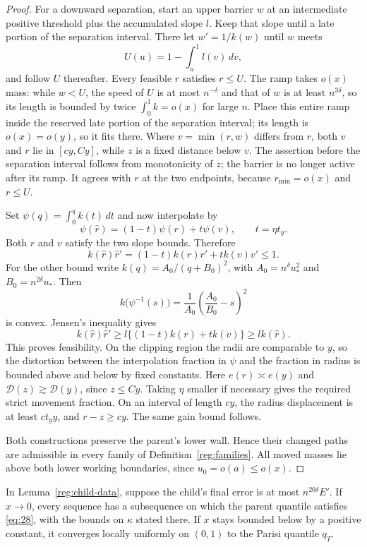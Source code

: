 \begin{proof}
For a downward separation, start an upper barrier $w$ at an
intermediate positive threshold plus the accumulated slope $l$.
Keep that slope until a late portion of the separation interval.
There let $w'=1/k(w)$ until $w$ meets
\[
 U(u)=1-\int_u^1l(v)\,dv,
\]
and follow $U$ thereafter.  Every feasible $r$ satisfies $r\le U$.
The ramp takes $o(x)$ mass: while $w<U$, the speed of $U$ is at
most $n^{-\delta}$ and that of $w$ is at least $n^{3\delta}$,
so its length is bounded by twice $\int_0^1k=o(x)$ for large $n$.
Place this entire ramp inside the reserved late portion of the
separation interval; its length is $o(x)=o(y)$, so it fits there.
Where $v=\min(r,w)$ differs from $r$, both $v$ and $r$ lie in
$[cy,Cy]$, while $z$ is a fixed distance below $v$.  The assertion
before the separation interval follows from monotonicity of $z$;
the barrier is no longer active after its ramp.  It agrees with
$r$ at the two endpoints, because $r_{\min}=o(x)$ and $r\le U$.

Set $\psi(q)=\int_0^qk(t)\,dt$ and now interpolate by
\[
 \psi(\widehat r)=(1-t)\psi(r)+t\psi(v),\qquad t=\eta t_y.
\]
Both $r$ and $v$ satisfy the two slope bounds.  Therefore
\[
 k(\widehat r)\widehat r'
      =(1-t)k(r)r'+tk(v)v'\le1.
\]
For the other bound write $k(q)=A_0/(q+B_0)^2$, with
$A_0=n^\delta u_*^2$ and $B_0=n^{2\delta}u_*$.  Then
\[
 k\bigl(\psi^{-1}(s)\bigr)
       =\frac1{A_0}\left(\frac{A_0}{B_0}-s\right)^2
\]
is convex.  Jensen's inequality gives
\[
 k(\widehat r)\widehat r'
    \ge l\{(1-t)k(r)+tk(v)\}\ge l k(\widehat r).
\]
This proves feasibility.  On the clipping region the radii are
comparable to $y$, so the distortion between the interpolation
fraction in $\psi$ and the fraction in radius is bounded above
and below by fixed constants.  Here $e(r)\asymp e(y)$ and
$\mathcal D(z)\gtrsim\mathcal D(y)$, since $z\le Cy$.
Taking $\eta$ smaller if necessary gives the required strict
movement fraction.  On an interval of length $cy$, the radius
displacement is at least $ct_yy$, and $r-z\ge cy$.
The same gain bound follows.

Both constructions preserve the parent's lower wall.  Hence their
changed paths are admissible in every family of
Definition~\ref{reg:families}.  All moved masses lie above both
lower working boundaries, since $u_0=o(a)\le o(x)$.
\end{proof}

\begin{lemma}
\label{reg:successful-child}
In Lemma~\ref{reg:child-data}, suppose the child's final error is at
most $n^{20\delta}E'$.  If $x\to0$, every sequence has a subsequence
on which the parent quantile satisfies \eqref{eq:28}, with the bounds
on $\kappa$ stated there.  If $x$ stays bounded below by a positive constant,
it converges locally uniformly on $(0,1)$ to the Parisi quantile $q_T$.
\end{lemma}

